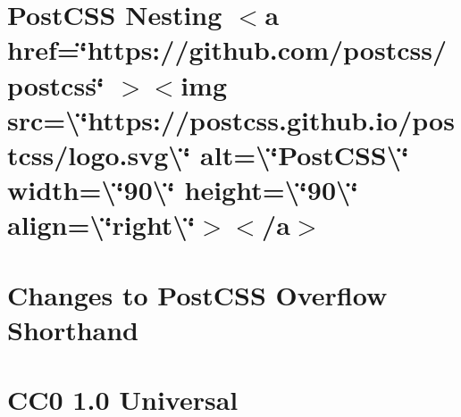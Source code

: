\documentclass[twoside]{book}
\newcommand{\+}{\discretionary{\mbox{\scriptsize$\hookleftarrow$}}{}{}}
\begin{document}
\chapter{Post\+CSS Nesting \texorpdfstring{$<$}{<}a href=\char`\"{}https\+://github.\+com/postcss/postcss\char`\"{} \texorpdfstring{$>$}{>}\texorpdfstring{$<$}{<}img src=\textbackslash{}\char`\"{}https\+://postcss.\+github.\+io/postcss/logo.\+svg\textbackslash{}\char`\"{} alt=\textbackslash{}\char`\"{}\+Post\+CSS\textbackslash{}\char`\"{} width=\textbackslash{}\char`\"{}90\textbackslash{}\char`\"{} height=\textbackslash{}\char`\"{}90\textbackslash{}\char`\"{} align=\textbackslash{}\char`\"{}right\textbackslash{}\char`\"{}\texorpdfstring{$>$}{>}\texorpdfstring{$<$}{<}/a\texorpdfstring{$>$}{>}}
\label{md__c___users_vaishnavi_jadhav__desktop__developer_code_mean_stack_example_client_node_modules_postcss_nesting__r_e_a_d_m_e}

\chapter{Changes to Post\+CSS Overflow Shorthand}
\label{md__c___users_vaishnavi_jadhav__desktop__developer_code_mean_stack_example_client_node_modules_p7205dbbdcda090d946d1b933e3e95022}

\chapter{CC0 1.0 Universal}
\label{md__c___users_vaishnavi_jadhav__desktop__developer_code_mean_stack_example_client_node_modules_p78ef6cb9d2e1dd59fff454de384d08ea}

\end{document}
